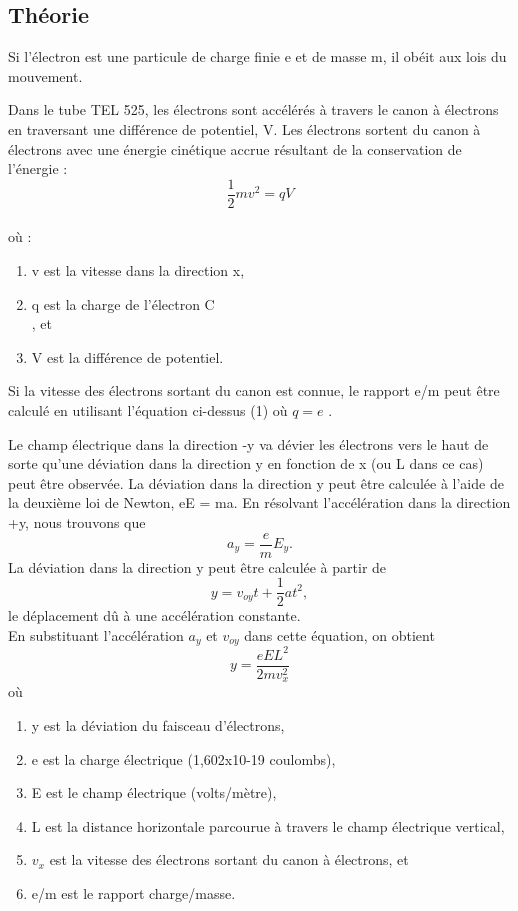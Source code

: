 \documentclass[../main.tex]{subfiles}
\begin{document}
\subsection{Théorie}
Si l'électron est une particule de charge finie e et de masse m, il obéit aux lois du mouvement. \\
\par Dans le tube TEL 525, les électrons sont accélérés à travers le canon à électrons en traversant une différence de potentiel, V. Les électrons sortent du canon à électrons avec une énergie cinétique accrue résultant de la conservation de l'énergie :\\
$$\frac{1}{2}mv^2 = qV$$\\
où :\\
\begin{enumerate}
    \item v est la vitesse dans la direction x, 
    \item q est la charge de l'électron \unit{\coulomb }\\, et 
    \item V est la différence de potentiel. 
\end{enumerate}
Si la vitesse des électrons sortant du canon est connue, le rapport e/m peut être calculé en utilisant l'équation ci-dessus (1) où $q = e$ .\\
\par Le champ électrique dans la direction -y va dévier les électrons vers le haut de sorte qu'une déviation dans la direction y en fonction de x (ou L dans ce cas) peut être observée.  La déviation dans la direction y peut être calculée à l'aide de la deuxième loi de Newton, eE = ma.  En résolvant l'accélération dans la direction +y, nous trouvons que\\
$$a_y = \frac{e}{m}E_y.$$ 
La déviation dans la direction y peut être calculée à partir de\\
$$y = v_{oy}t + \frac{1}{2}at^2,$$
le déplacement dû à une accélération constante.\\    En substituant l'accélération $a_y$ et $v_{oy}$ dans cette équation, on obtient \\
$$y = \frac{eEL^2}{2mv_x^2}$$
où\\
\begin{enumerate}
    \item y est la déviation du faisceau d'électrons,
    \item e est la charge électrique (1,602x10-19 coulombs),
    \item E est le champ électrique (volts/mètre), 
    \item L est la distance horizontale parcourue à travers le champ électrique vertical,
    \item $v_x$ est la vitesse des électrons sortant du canon à électrons, et
    \item e/m est le rapport charge/masse.
\end{enumerate}
\end{document}
